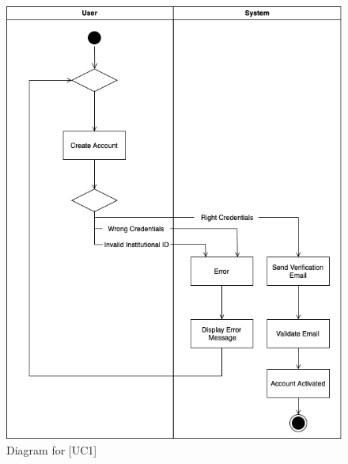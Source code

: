 \documentclass[12pt,oneside,a4paper]{article}
\begin{document}
\begin{figure}[htbp]
    \centering
    \includegraphics[width=1\linewidth]{Images/Diagrams/UserRegistration.png}
    \caption{Diagram for [UC1]}
    \label{fig:enter-label}
\end{figure}

\clearpage
\end{document}
